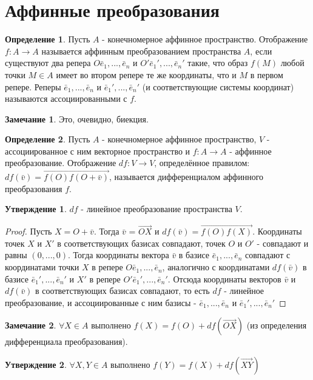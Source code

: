 \documentclass[a4paper, 12pt]{article}
\theoremstyle{definition}
\newtheorem*{definition}{Определение}
\newtheorem*{subtheorem}{Утверждение}
\newtheorem*{remark}{Замечание}
\begin{document}
\section{Аффинные преобразования}
\begin{definition}
	Пусть $A$ - конечномерное аффинное пространство. Отображение $f: A \rightarrow A$ называется аффинным преобразованием пространства $A$, если существуют два репера $O\bar{e}_{1},...,\bar{e}_{n}$ и $O'\bar{e}_{1}',...,\bar{e}_{n}'$ такие, что образ $f(M)$ любой точки $M \in A$ имеет во втором репере те же координаты, что и $M$ в первом репере. Реперы $\bar{e}_{1},...,\bar{e}_{n}$ и $\bar{e}_{1}',...,\bar{e}_{n}'$ (и соответствующие системы координат) называются ассоциированными с $f$.
\end{definition}
\begin{remark}
	Это, очевидно, биекция.
\end{remark}
\begin{definition}
	Пусть $A$ - конечномерное аффинное пространство, $V$ - ассоциированное с ним векторное пространство и $f: A\rightarrow A$ - аффинное преобразование. Отображение $df: V\rightarrow V$, определённое правилом: $df(\bar{v}) = \overrightarrow{f(O)f(O+\bar{v})}$, называется дифференциалом аффинного преобразования $f$.
\end{definition}
\begin{subtheorem}
	$df$ - линейное преобразование пространства $V$. 
\end{subtheorem}
\begin{proof}
	Пусть $X = O + \bar{v}$. Тогда $\bar{v}$ = $\overrightarrow{OX}$ и $df(\bar{v}) = \overrightarrow{f(O)f(X)}$. Координаты точек $X$ и $X'$ в соответствующих базисах совпадают, точек $O$ и $O'$ - совпадают и равны $(0,...,0)$. Тогда координаты вектора $\bar{v}$ в базисе $\bar{e}_{1},...,\bar{e}_{n}$ совпадают с координатами точки $X$ в репере $O\bar{e}_{1},...,\bar{e}_{n}$, аналогично с координатами $df(\bar{v})$ в базисе $\bar{e}_{1}',...,\bar{e}_{n}'$ и $X'$ в репере $O'\bar{e}_{1}',...,\bar{e}_{n}'$. Отсюда координаты векторов $\bar{v}$ и $df(\bar{v})$ в соответствующих базисах совпадают, то есть $df$ - линейное преобразование, и ассоциированные с ним базисы - $\bar{e}_{1},...,\bar{e}_{n}$ и $\bar{e}_{1}',...,\bar{e}_{n}'$
\end{proof}
\begin{remark}
	$\forall X \in A$ выполнено $f(X) = f(O) + df(\overrightarrow{OX})$ (из определения дифференциала преобразования).
\end{remark}
\begin{subtheorem}
	$\forall X, Y \in A$ выполнено $f(Y) = f(X) + df(\overrightarrow{XY})$
\end{subtheorem}
\end{document}
